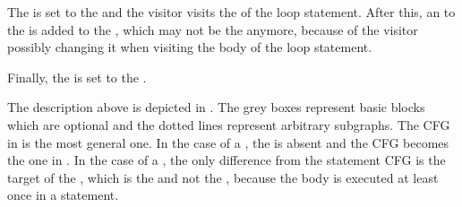 The  is set to the  and the visitor visits the  of the loop statement.
After this, an  to the  is added to the ,
which may not be the  anymore, because of the visitor possibly changing it when visiting the body of the
loop statement.

Finally, the  is set to the .

The description above is depicted in . The grey boxes represent basic blocks
which are optional and the dotted lines represent arbitrary subgraphs. The CFG in 
is the most general one. In the case of a , the  is absent and the CFG becomes
the one in . In the case of a , the only difference
from the  statement CFG is the target of the , which is the
 and not the , because the body is executed at least once in a 
statement.


